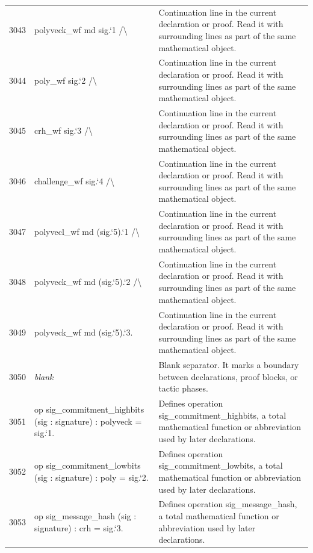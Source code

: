 \documentclass[10pt]{article}
\begin{document}
\begin{longtable}{r L{0.53\textwidth} L{0.37\textwidth}}
3043 & {\ttfamily\scriptsize   polyveck\_wf md sig.`1 /\textbackslash{}} & Continuation line in the current declaration or proof.  Read it with surrounding lines as part of the same mathematical object. \\
3044 & {\ttfamily\scriptsize   poly\_wf sig.`2 /\textbackslash{}} & Continuation line in the current declaration or proof.  Read it with surrounding lines as part of the same mathematical object. \\
3045 & {\ttfamily\scriptsize   crh\_wf sig.`3 /\textbackslash{}} & Continuation line in the current declaration or proof.  Read it with surrounding lines as part of the same mathematical object. \\
3046 & {\ttfamily\scriptsize   challenge\_wf sig.`4 /\textbackslash{}} & Continuation line in the current declaration or proof.  Read it with surrounding lines as part of the same mathematical object. \\
3047 & {\ttfamily\scriptsize   polyvecl\_wf md (sig.`5).`1 /\textbackslash{}} & Continuation line in the current declaration or proof.  Read it with surrounding lines as part of the same mathematical object. \\
3048 & {\ttfamily\scriptsize   polyveck\_wf md (sig.`5).`2 /\textbackslash{}} & Continuation line in the current declaration or proof.  Read it with surrounding lines as part of the same mathematical object. \\
3049 & {\ttfamily\scriptsize   polyveck\_wf md (sig.`5).`3.} & Continuation line in the current declaration or proof.  Read it with surrounding lines as part of the same mathematical object. \\
3050 & {\ttfamily\scriptsize \emph{blank}} & Blank separator.  It marks a boundary between declarations, proof blocks, or tactic phases. \\
3051 & {\ttfamily\scriptsize op sig\_commitment\_highbits (sig : signature) : polyveck = sig.`1.} & Defines operation sig\_commitment\_highbits, a total mathematical function or abbreviation used by later declarations. \\
3052 & {\ttfamily\scriptsize op sig\_commitment\_lowbits (sig : signature) : poly = sig.`2.} & Defines operation sig\_commitment\_lowbits, a total mathematical function or abbreviation used by later declarations. \\
3053 & {\ttfamily\scriptsize op sig\_message\_hash (sig : signature) : crh = sig.`3.} & Defines operation sig\_message\_hash, a total mathematical function or abbreviation used by later declarations. \\

\end{longtable}
\end{document}
